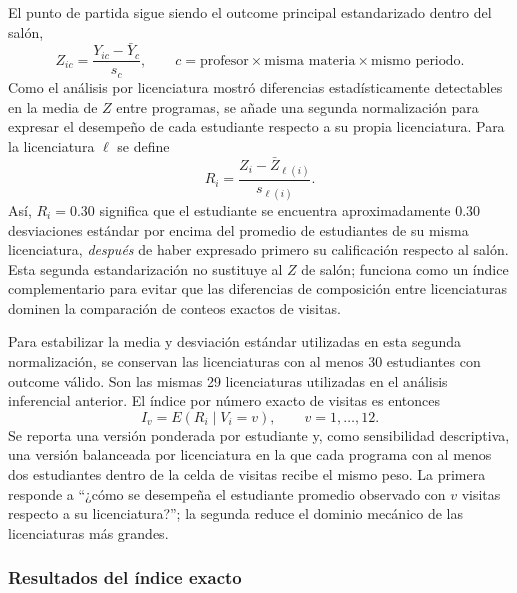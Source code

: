El punto de partida sigue siendo el outcome principal estandarizado dentro del salón,
\[
Z_{ic}=\frac{Y_{ic}-\bar Y_c}{s_c},
\qquad
c=\text{profesor}\times\text{misma materia}\times\text{mismo periodo}.
\]
Como el análisis por licenciatura mostró diferencias estadísticamente detectables en la media de $Z$ entre programas, se añade una segunda normalización para expresar el desempeño de cada estudiante respecto a su propia licenciatura. Para la licenciatura $\ell$ se define
\[
R_i=\frac{Z_i-\bar Z_{\ell(i)}}{s_{\ell(i)}}.
\]
Así, $R_i=0.30$ significa que el estudiante se encuentra aproximadamente 0.30 desviaciones estándar por encima del promedio de estudiantes de su misma licenciatura, \emph{después} de haber expresado primero su calificación respecto al salón. Esta segunda estandarización no sustituye al $Z$ de salón; funciona como un índice complementario para evitar que las diferencias de composición entre licenciaturas dominen la comparación de conteos exactos de visitas.

Para estabilizar la media y desviación estándar utilizadas en esta segunda normalización, se conservan las licenciaturas con al menos 30 estudiantes con outcome válido. Son las mismas 29 licenciaturas utilizadas en el análisis inferencial anterior. El índice por número exacto de visitas es entonces
\[
I_v=E(R_i\mid V_i=v),\qquad v=1,\ldots,12.
\]
Se reporta una versión ponderada por estudiante y, como sensibilidad descriptiva, una versión balanceada por licenciatura en la que cada programa con al menos dos estudiantes dentro de la celda de visitas recibe el mismo peso. La primera responde a ``¿cómo se desempeña el estudiante promedio observado con $v$ visitas respecto a su licenciatura?''; la segunda reduce el dominio mecánico de las licenciaturas más grandes.

\subsubsection{Resultados del índice exacto}

